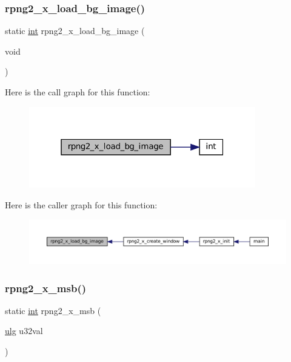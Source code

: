 \subsubsection{\texorpdfstring{rpng2\+\_\+x\+\_\+load\+\_\+bg\+\_\+image()}{rpng2\_x\_load\_bg\_image()}}
{\footnotesize\ttfamily static \mbox{\hyperlink{ioapi_8h_a787fa3cf048117ba7123753c1e74fcd6}{int}} rpng2\+\_\+x\+\_\+load\+\_\+bg\+\_\+image (\begin{DoxyParamCaption}\item[{void}]{ }\end{DoxyParamCaption})\hspace{0.3cm}{\ttfamily [static]}}

Here is the call graph for this function\+:
\nopagebreak
\begin{figure}[H]
\begin{center}
\leavevmode
\includegraphics[width=280pt]{rpng2-x_8c_ad02636450f027c837e6a3fbbe7a81829_cgraph}
\end{center}
\end{figure}
Here is the caller graph for this function\+:
\nopagebreak
\begin{figure}[H]
\begin{center}
\leavevmode
\includegraphics[width=350pt]{rpng2-x_8c_ad02636450f027c837e6a3fbbe7a81829_icgraph}
\end{center}
\end{figure}
\mbox{\label{rpng2-x_8c_a6d049c205a7e333060fd97d7a41e71ff}} 
\subsubsection{\texorpdfstring{rpng2\+\_\+x\+\_\+msb()}{rpng2\_x\_msb()}}
{\footnotesize\ttfamily static \mbox{\hyperlink{ioapi_8h_a787fa3cf048117ba7123753c1e74fcd6}{int}} rpng2\+\_\+x\+\_\+msb (\begin{DoxyParamCaption}\item[{\mbox{\hyperlink{readpng_8h_abd6f60bf9450af2ecb94097a32c19a64}{ulg}}}]{u32val }\end{DoxyParamCaption})\hspace{0.3cm}{\ttfamily [static]}}

